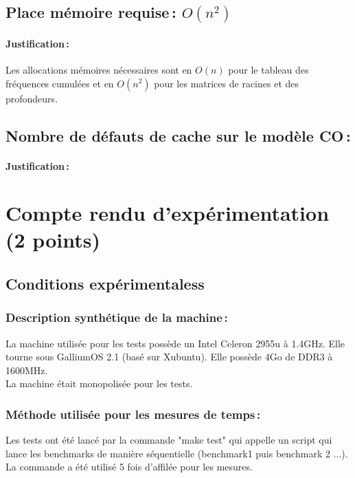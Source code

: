 \documentclass[a4paper, 10pt, french]{article}
\begin{document}
  \subsection{Place mémoire requise\,: $O(n^2)$}
    \paragraph{Justification\,: } Les allocations mémoires nécessaires sont en $O(n)$ pour le tableau des fréquences cumulées et en $O(n^2)$ pour les matrices de racines et des profondeurs.

  \subsection{Nombre de défauts de cache sur le modèle CO\,: }
    \paragraph{Justification\,: }


\section{Compte rendu d'expérimentation (2 points)}
  \subsection{Conditions expérimentaless}

    \subsubsection{Description synthétique de la machine\,:} 
	La machine utilisée pour les tests possède un Intel Celeron 2955u à 1.4GHz. Elle tourne sous GalliumOS 2.1 (basé sur Xubuntu). Elle possède 4Go de DDR3 à 1600MHz. \\
	La machine était monopolisée pour les tests.

    \subsubsection{Méthode utilisée pour les mesures de temps\,: } 
    Les tests ont été lancé par la commande "make test" qui appelle un script qui lance les benchmarks de manière séquentielle (benchmark1 puis benchmark 2 ...).
    La commande a été utilisé 5 fois d'affilée pour les mesures.\\
    
\end{document}
